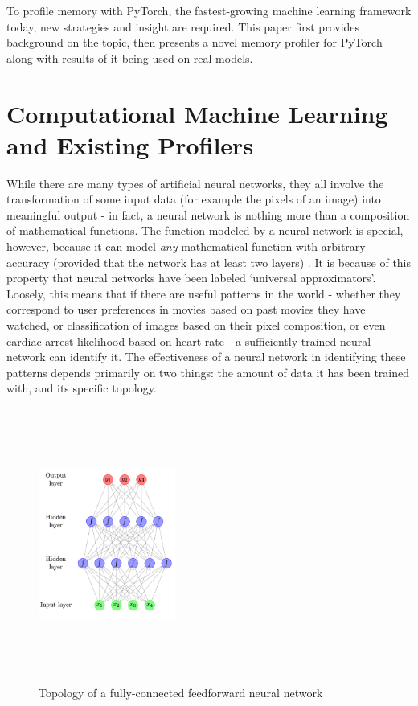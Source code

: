 \documentclass[12pt,letterpaper]{article}
\begin{document}
To profile memory with PyTorch, the fastest-growing machine learning framework today, new strategies and insight are required. This paper first provides background on the topic, then presents a novel memory profiler for PyTorch along with results of it being used on real models. \par 

\section{Computational Machine Learning and Existing Profilers}
While there are many types of artificial neural networks, they all involve the transformation of some input data (for example the pixels of an image) into meaningful output - in fact, a neural network is nothing more than a composition of mathematical functions. The function modeled by a neural network is special, however, because it can model \textit{any} mathematical function with arbitrary accuracy (provided that the network has at least two layers) \cite{dnn_history}. It is because of this property that neural networks have been labeled \enquote*{universal approximators}. Loosely, this means that if there are useful patterns in the world - whether they correspond to user preferences in movies based on past movies they have watched, or classification of images based on their pixel composition, or even cardiac arrest likelihood based on heart rate - a sufficiently-trained neural network can identify it. The effectiveness of a neural network in identifying these patterns depends primarily on two things: the amount of data it has been trained with, and its specific topology.
\par

\begin{figure}[h]
\centering
\includegraphics[width=0.4\textwidth,height=9cm]{neural_network_machinelearningmastery.png}
\captionsetup{width=0.7\linewidth}
\caption{ Topology of a fully-connected feedforward neural network \cite{feedforward_pic}}
\label{fig:feedforwardNN}
\end{figure}
\end{document}
